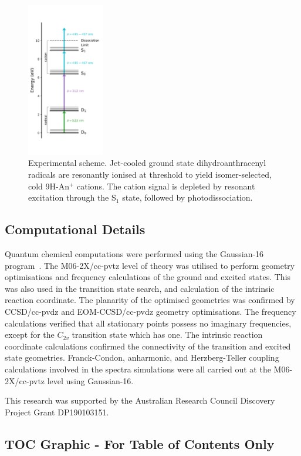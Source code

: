 \documentclass[journal=jpcafh,manuscript=article,layout=onecolumn, 12pt]{achemso}
\begin{document}
\begin{figure} [h]
	\includegraphics[width=0.3\textwidth]{figures/Figure7}
	\caption{Experimental scheme. Jet-cooled ground state dihydroanthracenyl radicals are resonantly ionised at threshold to yield isomer-selected, cold 9H-An$^+$ cations. The cation signal is depleted by resonant excitation through the S$_1$ state, followed by photodissociation. }
	\label{Fig:7}
\end{figure}

\subsection{Computational Details}
Quantum chemical computations were performed using the Gaussian-16 program~\cite{g16}. The M06-2X/cc-pvtz level of theory was utilised to perform geometry optimisations and frequency calculations of the ground and excited states. This was also used in the transition state search, and calculation of the intrinsic reaction coordinate. The planarity of the optimised geometries was confirmed by CCSD/cc-pvdz and EOM-CCSD/cc-pvdz geometry optimisations. The frequency calculations verified that all stationary points possess no imaginary frequencies, except for the $C_{2v}$ transition state which has one. The intrinsic reaction coordinate calculations confirmed the connectivity of the transition and excited state geometries. Franck-Condon, anharmonic, and Herzberg-Teller coupling calculations involved in the spectra simulations were all carried out at the M06-2X/cc-pvtz level using Gaussian-16.

\begin{acknowledgement}
	This research was supported by the Australian Research Council Discovery
	Project Grant DP190103151.  
\end{acknowledgement}



\newpage
\onecolumn
\subsection{TOC Graphic - For Table of Contents Only}
\vspace{2ex}
\begin{center}
\end{center}
\end{document}
